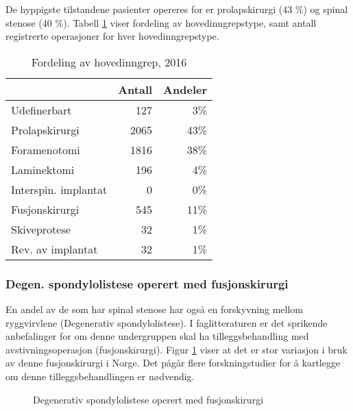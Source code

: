 \documentclass [norsk,a4paper,twoside]{article}\usepackage[]{graphicx}\usepackage[]{color}
\begin{document}
De hyppigste tilstandene pasienter opereres for er prolapskirurgi (43 \%) og spinal stenose (40 \%). Tabell \ref{tab:AntHovedInngrep} viser fordeling av hovedinngrepstype, samt antall registrerte operasjoner for hver hovedinngrepstype.

\begin{table}[ht]
\centering
\begin{tabular}{lrr}
  \hline
 & Antall & Andeler \\ 
  \hline
Udefinerbart & 127 & 3\% \\ 
  Prolapskirurgi & 2065 & 43\% \\ 
  Foramenotomi & 1816 & 38\% \\ 
  Laminektomi & 196 & 4\% \\ 
  Interspin. implantat & 0 & 0\% \\ 
  Fusjonskirurgi & 545 & 11\% \\ 
  Skiveprotese & 32 & 1\% \\ 
  Rev. av implantat & 32 & 1\% \\ 
   \hline
\end{tabular}
\caption{Fordeling av hovedinngrep, 2016} 
\label{tab:AntHovedInngrep}
\end{table}






\subsubsection{Degen. spondylolistese operert med fusjonskirurgi}


En andel av de som har spinal stenose har også en forskyvning mellom ryggvirvlene (Degenerativ spondylolistese). I faglitteraturen er det sprikende anbefalinger for om denne undergruppen skal ha tilleggsbehandling med avstivningsoperasjon (fusjonskirurgi).
Figur \ref{fig:degSponFusj} viser at det er stor variasjon i bruk av denne fusjonskirurgi i Norge. Det pågår flere forskningstudier for å kartlegge om denne tilleggsbehandlingen er nødvendig. 



\begin{figure}[ht]
\caption{\label{fig:degSponFusj} Degenerativ spondylolistese operert med fusjonskirurgi}
\end{figure}
\end{document}
